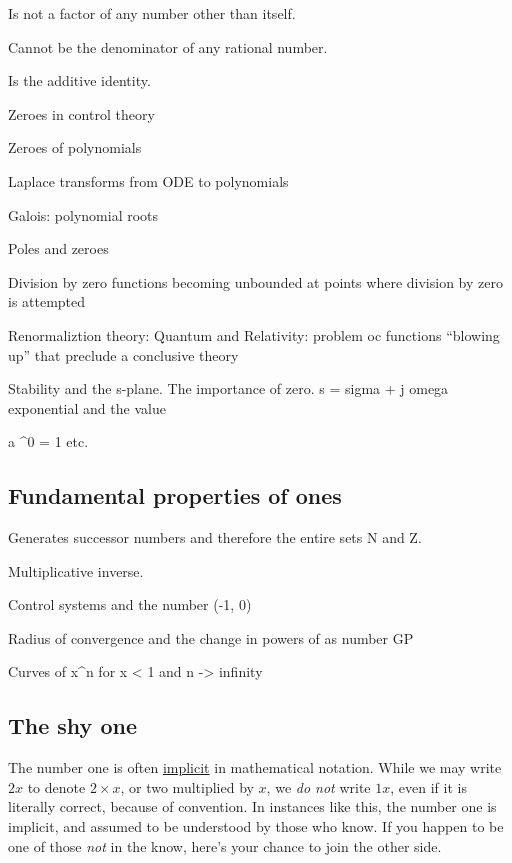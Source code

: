 \documentclass[
  a4paper,
]{article}
\begin{document}
Is not a factor of any number other than itself.

Cannot be the denominator of any rational number.

Is the additive identity.

Zeroes in control theory

Zeroes of polynomials

Laplace transforms from ODE to polynomials

Galois: polynomial roots

Poles and zeroes

Division by zero functions becoming unbounded at points where division
by zero is attempted

Renormaliztion theory: Quantum and Relativity: problem oc functions
``blowing up'' that preclude a conclusive theory

Stability and the s-plane. The importance of zero. s = sigma + j omega
exponential and the value

a \^{}0 = 1 etc.

\hypertarget{fundamental-properties-of-ones}{%
\subsection{Fundamental properties of
ones}\label{fundamental-properties-of-ones}}

Generates successor numbers and therefore the entire sets N and Z.

Multiplicative inverse.

Control systems and the number (-1, 0)

Radius of convergence and the change in powers of as number GP

Curves of x\^{}n for x \textless{} 1 and n -\textgreater{} infinity

\hypertarget{the-shy-one}{%
\subsection{The shy one}\label{the-shy-one}}

The number one is often
\href{https://www.vocabulary.com/dictionary/implicit}{implicit} in
mathematical notation. While we may write \(2x\) to denote
\(2\times x\), or two multiplied by \(x\), we \emph{do not} write
\(1x\), even if it is literally correct, because of convention. In
instances like this, the number one is implicit, and assumed to be
understood by those who know. If you happen to be one of those
\emph{not} in the know, here's your chance to join the other side.
\end{document}
